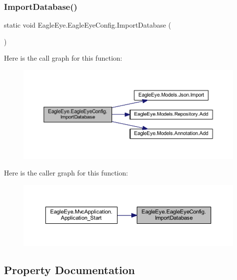 \subsubsection{\texorpdfstring{ImportDatabase()}{ImportDatabase()}}
{\footnotesize\ttfamily static void Eagle\+Eye.\+Eagle\+Eye\+Config.\+Import\+Database (\begin{DoxyParamCaption}{ }\end{DoxyParamCaption})\hspace{0.3cm}{\ttfamily [static]}}

Here is the call graph for this function\+:\nopagebreak
\begin{figure}[H]
\begin{center}
\leavevmode
\includegraphics[width=350pt]{class_eagle_eye_1_1_eagle_eye_config_a321d469bb1a71e255f2318ad1ec30058_cgraph}
\end{center}
\end{figure}
Here is the caller graph for this function\+:\nopagebreak
\begin{figure}[H]
\begin{center}
\leavevmode
\includegraphics[width=350pt]{class_eagle_eye_1_1_eagle_eye_config_a321d469bb1a71e255f2318ad1ec30058_icgraph}
\end{center}
\end{figure}


\subsection{Property Documentation}
\mbox{\label{class_eagle_eye_1_1_eagle_eye_config_a69b4d9e94fceeaf4fad38f727b614b66}} 
